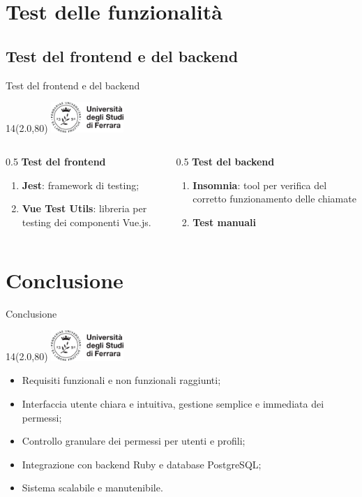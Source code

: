 \documentclass[11pt,xcolor={dvipsnames}]{beamer} %
\newcommand{\MyLogo}{%
\begin{textblock}{14}(2.0,80)
 \includegraphics[height=1.15cm, angle=0]{logo}
\end{textblock}
}
\begin{document}
\section{Test delle funzionalità}

\subsection{Test del frontend e del backend}

\begin{frame}{Test del frontend e del backend}
	\transboxin
	\MyLogo
	\begin{columns}[T] %
		\begin{column}{0.5\textwidth}
			\textbf{Test del frontend}
			\begin{enumerate}
				\item \textbf{Jest}: framework di testing;
				\item \textbf{Vue Test Utils}: libreria per testing dei componenti Vue.js.
			\end{enumerate}
		\end{column}
		\begin{column}{0.5\textwidth}
			\textbf{Test del backend}
			\begin{enumerate}
				\item \textbf{Insomnia}: tool per verifica del corretto funzionamento delle chiamate
				\item \textbf{Test manuali}
			\end{enumerate}
		\end{column}
	\end{columns}
\end{frame}

\section{Conclusione}

\begin{frame}{Conclusione}
	\transboxin
	\MyLogo
	\begin{itemize}
		\item Requisiti funzionali e non funzionali raggiunti;
		\item Interfaccia utente chiara e intuitiva, gestione semplice e immediata dei permessi;
		\item Controllo granulare dei permessi per utenti e profili;
		\item Integrazione con backend Ruby e database PostgreSQL;
		\item Sistema scalabile e manutenibile.
	\end{itemize}
\end{frame}
\end{document}
